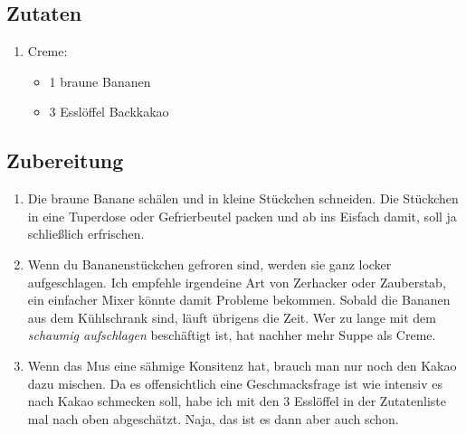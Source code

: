     \subsection*{Zutaten}
      \begin{enumerate}
        \item Creme:
        \begin{itemize}
          \item 1 braune Bananen
          \item 3 Esslöffel Backkakao
        \end{itemize}
      \end{enumerate}

    \subsection*{Zubereitung}
      \begin{enumerate}
        \item Die braune Banane schälen und in kleine Stückchen schneiden. Die
              Stückchen in eine Tuperdose oder Gefrierbeutel packen und ab ins
              Eisfach damit, soll ja schließlich erfrischen.
        \item Wenn du Bananenstückchen gefroren sind, werden sie ganz locker
              aufgeschlagen. Ich empfehle irgendeine Art von Zerhacker oder
              Zauberstab, ein einfacher Mixer könnte damit Probleme bekommen.
              Sobald die Bananen aus dem Kühlschrank sind, läuft übrigens die
              Zeit. Wer zu lange mit dem \emph{schaumig aufschlagen} beschäftigt
              ist, hat nachher mehr Suppe als Creme.
        \item Wenn das Mus eine sähmige Konsitenz hat, brauch man nur noch den
              Kakao dazu mischen. Da es offensichtlich eine Geschmacksfrage ist
              wie intensiv es nach Kakao schmecken soll, habe ich mit den 3
              Esslöffel in der Zutatenliste mal nach oben abgeschätzt. Naja,
              das ist es dann aber auch schon.
      \end{enumerate}

